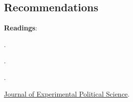 \documentclass[letterpaper]{article}
\renewenvironment{itemize}{
  \begin{list}{}{
    \setlength{\leftmargin}{1.5em}
  }
}{
  \end{list}
}
\begin{document}
\subsection*{Recommendations}

\begin{itemize}

  \item {\bf Readings}: 

    \begin{itemize} 



    \item[$\diamond$] \href{http://www.nber.org/papers/w14690}{}.

    \item[$\diamond$] \href{http:www.aeaweb.org/articles.php?doi=10.1257/jel.48.2.399}{}.


    \item[$\diamond$] \href{https://doi-org.ezproxy.utu.fi/10.1017/CBO9780511762888}{}.


    \item[$\diamond$] \href{https://www.cambridge.org/core/journals/journal-of-experimental-political-science}{Journal of Experimental Political Science}.


\end{itemize}
\end{itemize}
\end{document}
